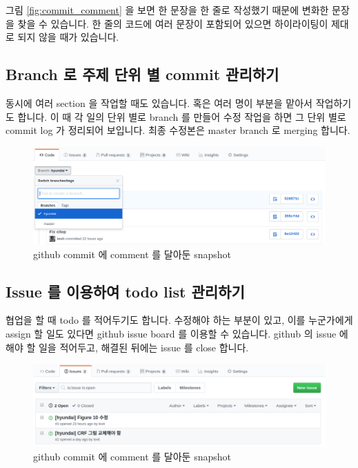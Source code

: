 \documentclass[11pt]{article}
\begin{document}
그림 \ref{fig:commit_comment} 을 보면 한 문장을 한 줄로 작성했기 때문에 변화한 문장을 찾을 수 있습니다.
한 줄의 코드에 여러 문장이 포함되어 있으면 하이라이팅이 제대로 되지 않을 때가 있습니다.

\subsection{Branch 로 주제 단위 별 commit 관리하기}

동시에 여러 section 을 작업할 때도 있습니다.
혹은 여러 명이 부분을 맡아서 작업하기도 합니다.
이 때 각 일의 단위 별로 branch 를 만들어 수정 작업을 하면 그 단위 별로 commit log 가 정리되어 보입니다.
최종 수정본은 master branch 로 merging 합니다.

\begin{figure}[ht]
\centering
\includegraphics[keepaspectratio=true, width=0.8\linewidth]{figures/github-branch.png}
\caption{github commit 에 comment 를 달아둔 snapshot}
\label{fig:github-branch}
\end{figure}

\subsection{Issue 를 이용하여 todo list 관리하기}

협업을 할 때 todo 를 적어두기도 합니다.
수정해야 하는 부분이 있고, 이를 누군가에게 assign 할 일도 있다면 github issue board 를 이용할 수 있습니다.
github 의 issue 에 해야 할 일을 적어두고, 해결된 뒤에는 issue 를 close 합니다.

\begin{figure}[ht]
\centering
\includegraphics[keepaspectratio=true, width=0.8\linewidth]{figures/github-issue.png}
\caption{github commit 에 comment 를 달아둔 snapshot}
\label{fig:github-issue}
\end{figure}
\end{document}
